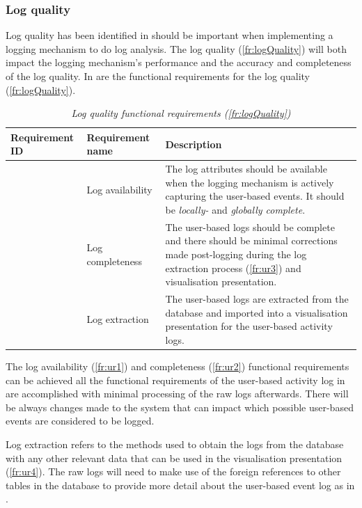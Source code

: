\subsubsection{Log quality}
Log quality has been identified in  should be important when implementing a logging mechanism to do log analysis. The log quality (\ref{fr:logQuality}) will both impact the logging mechanism's performance and the accuracy and completeness of the log quality.  In  are the functional requirements for the log quality (\ref{fr:logQuality}).

\setcounter{phase}{3}
\setcounter{subphase}{1}
\begin{table}[!htb]
	\centering
	\small
	\caption[Log quality functional requirements (\ref{fr:logQuality})]
	{\textit{Log quality functional requirements (\ref{fr:logQuality})}}
	\label{tbl:ch2_utilisation_requirements}
	\begin{tabularx}{\textwidth}{|l|l|X|}
		\hline \textbf{Requirement ID} & \textbf{Requirement name} & \textbf{Description} \\
		\hline \subsubphase{fr:ur1} & Log availability & \RaggedRight The log attributes should be available when the logging mechanism is actively capturing the user-based events. It should be \textit{locally-} and \textit{globally complete}.  \\
		\hline \subsubphase{fr:ur2} & Log completeness & \RaggedRight The user-based logs should be complete and there should be minimal corrections made post-logging during the log extraction process (\ref{fr:ur3}) and visualisation presentation. \\
		\hline \subsubphase{fr:ur3} & Log extraction & \RaggedRight The user-based logs are extracted from the database and imported into a visualisation presentation for the user-based activity logs. \\
		\hline
	\end{tabularx}
\end{table}

The log availability (\ref{fr:ur1}) and completeness (\ref{fr:ur2}) functional requirements can be achieved all the functional requirements of the user-based activity log in  are accomplished with minimal processing of the raw logs afterwards. There will be always changes made to the system that can impact which possible user-based events are considered to be logged.\par Log extraction refers to the methods used to obtain the logs from the database with any other relevant data that can be used in the visualisation presentation (\ref{fr:ur4}). The raw logs will need to make use of the foreign references to other tables in the database to provide more detail about the user-based event log as in .

